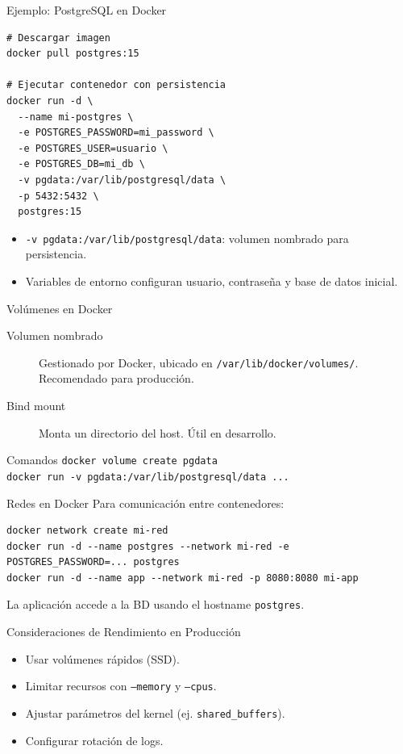 \documentclass[aspectratio=169, 10pt, xcolor=table]{beamer}
\begin{document}
\begin{frame}[fragile]{Ejemplo: PostgreSQL en Docker}
    \begin{lstlisting}[style=bashstyle]
# Descargar imagen
docker pull postgres:15

# Ejecutar contenedor con persistencia
docker run -d \
  --name mi-postgres \
  -e POSTGRES_PASSWORD=mi_password \
  -e POSTGRES_USER=usuario \
  -e POSTGRES_DB=mi_db \
  -v pgdata:/var/lib/postgresql/data \
  -p 5432:5432 \
  postgres:15
    \end{lstlisting}
    \begin{itemize}
        \item \texttt{-v pgdata:/var/lib/postgresql/data}: volumen nombrado para persistencia.
        \item Variables de entorno configuran usuario, contraseña y base de datos inicial.
    \end{itemize}
\end{frame}

\begin{frame}{Volúmenes en Docker}
    \begin{description}
        \item[Volumen nombrado] Gestionado por Docker, ubicado en \texttt{/var/lib/docker/volumes/}. Recomendado para producción.
        \item[Bind mount] Monta un directorio del host. Útil en desarrollo.
    \end{description}
    \begin{exampleblock}{Comandos}
        \texttt{docker volume create pgdata}\\
        \texttt{docker run -v pgdata:/var/lib/postgresql/data ...}
    \end{exampleblock}
\end{frame}

\begin{frame}[fragile]{Redes en Docker}
    Para comunicación entre contenedores:
    \begin{lstlisting}[style=bashstyle]
docker network create mi-red
docker run -d --name postgres --network mi-red -e POSTGRES_PASSWORD=... postgres
docker run -d --name app --network mi-red -p 8080:8080 mi-app
    \end{lstlisting}
    La aplicación accede a la BD usando el hostname \texttt{postgres}.
\end{frame}

\begin{frame}{Consideraciones de Rendimiento en Producción}
    \begin{itemize}
        \item Usar volúmenes rápidos (SSD).
        \item Limitar recursos con \texttt{--memory} y \texttt{--cpus}.
        \item Ajustar parámetros del kernel (ej. \texttt{shared\_buffers}).
        \item Configurar rotación de logs.
    \end{itemize}
\end{frame}
\end{document}
